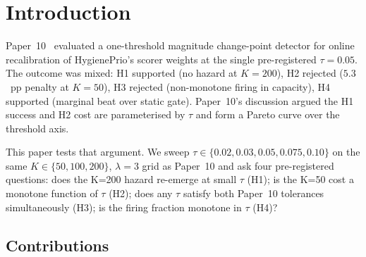 \section{Introduction}

Paper~10~\cite{paper10adaptive} evaluated a one-threshold magnitude
change-point detector for online recalibration of HygienePrio's
scorer weights at the single pre-registered $\tau = 0.05$. The
outcome was mixed: H1 supported (no hazard at $K = 200$), H2 rejected
($5.3$~pp penalty at $K = 50$), H3 rejected (non-monotone firing in
capacity), H4 supported (marginal beat over static gate). Paper~10's
discussion argued the H1 success and H2 cost are parameterised by
$\tau$ and form a Pareto curve over the threshold axis.

This paper tests that argument. We sweep $\tau \in \{0.02, 0.03,
0.05, 0.075, 0.10\}$ on the same $K \in \{50, 100, 200\}$,
$\lambda = 3$ grid as Paper~10 and ask four pre-registered questions:
does the K=200 hazard re-emerge at small $\tau$ (H1); is the K=50
cost a monotone function of $\tau$ (H2); does any $\tau$ satisfy
both Paper~10 tolerances simultaneously (H3); is the firing fraction
monotone in $\tau$ (H4)?

\subsection{Contributions}

